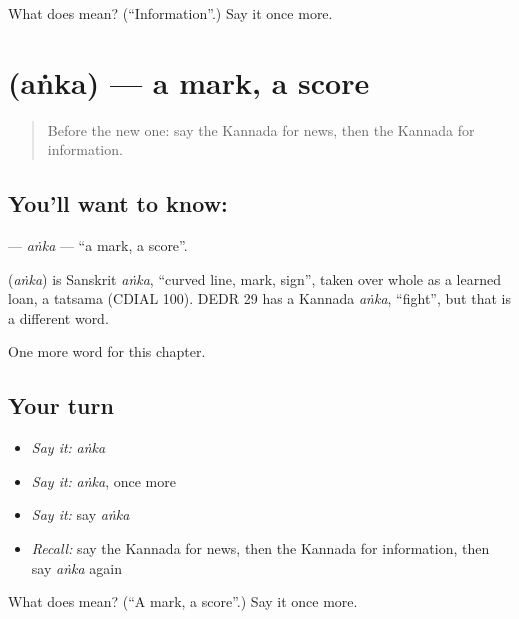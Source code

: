 \begin{tcolorbox}[breakable,colback=teal!4,colframe=teal!35!black,title={Before you move on}]
What does  mean? (\textquotedblleft{}Information\textquotedblright{}.) Say it once more.
\end{tcolorbox}
\section[\texorpdfstring{\kn{ಅಂಕ} (aṅka)}{ಅಂಕ (aṅka)}]{ (aṅka) — a mark, a score}

\label{lesson:KA-C269-anka}



\begin{quote}
Before the new one: say the Kannada for news, then the Kannada for information.
\end{quote}

\subsection*{You'll want to know: }
\textbf{} — \emph{aṅka} — \textquotedblleft{}a mark, a score\textquotedblright{}.

\begin{cousinweb}
\textbf{} (\emph{aṅka}) is Sanskrit \emph{aṅka}, \textquotedblleft{}curved line, mark, sign\textquotedblright{}, taken over whole as a learned loan, a tatsama (CDIAL 100). DEDR 29 has a Kannada \emph{aṅka}, \textquotedblleft{}fight\textquotedblright{}, but that is a different word.
\end{cousinweb}

\begin{grammarlens}[title={What you've built}]
One more word for this chapter.
\end{grammarlens}

\subsection*{Your turn}
\begin{itemize}
\raggedright
  \item \emph{Say it:} \emph{aṅka}
  \item \emph{Say it:} \emph{aṅka}, once more
  \item \emph{Say it:} say \emph{aṅka}
  \item \emph{Recall:} say the Kannada for news, then the Kannada for information, then say \emph{aṅka} again
\end{itemize}

\begin{tcolorbox}[breakable,colback=teal!4,colframe=teal!35!black,title={Before you move on}]
What does  mean? (\textquotedblleft{}A mark, a score\textquotedblright{}.) Say it once more.
\end{tcolorbox}
